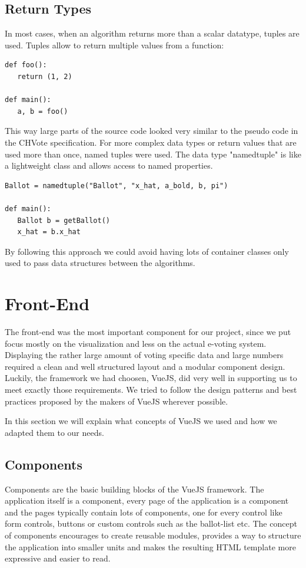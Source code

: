 \subsection{Return Types}
In most cases, when an algorithm returns more than a scalar datatype, tuples are used. Tuples allow to return multiple values from a function:

\begin{verbatim}
def foo():
   return (1, 2)

def main():
   a, b = foo()
\end{verbatim}

This way large parts of the source code looked very similar to the pseudo code in the CHVote specification. For more complex data types or return values that are used more than once, named tuples were used. The data type "namedtuple" is like a lightweight class and allows access to named properties.

\begin{verbatim}
Ballot = namedtuple("Ballot", "x_hat, a_bold, b, pi")

def main():
   Ballot b = getBallot()
   x_hat = b.x_hat
\end{verbatim}

By following this approach we could avoid having lots of container classes only used to pass data structures between the algorithms.

\section{Front-End}
The front-end was the most important component for our project, since we put focus mostly on the visualization and less on the actual e-voting system. Displaying the rather large amount of voting specific data and large numbers required a clean and well structured layout and a modular component design. Luckily, the framework we had choosen, VueJS, did very well in supporting us to meet exactly those requirements. We tried to follow the design patterns and best practices proposed by the makers of VueJS wherever possible.

In this section we will explain what concepts of VueJS we used and how we adapted them to our needs.

\subsection{Components}
Components are the basic building blocks of the VueJS framework. The application itself is a component, every page of the application is a component and the pages typically contain lots of components, one for every control like form controls, buttons or custom controls such as the ballot-list etc. The concept of components encourages to create reusable modules, provides a way to structure the application into smaller units and makes the resulting HTML template more expressive and easier to read.

